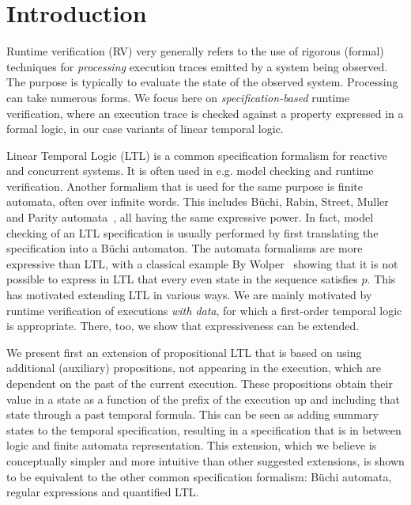 \section{Introduction}

Runtime verification (RV)  \cite{bartocci18,havelund-rv-data-2018} very generally refers to the use of rigorous (formal) 
techniques for {\em processing} execution traces emitted by a system being observed. The purpose is typically
to evaluate the state of the observed system. Processing can take numerous
forms. We focus here on {\em specification-based} runtime verification, where an execution trace is checked against a property expressed in a formal logic, in our case variants of linear temporal logic.

Linear Temporal Logic (LTL) is a common specification formalism for reactive and concurrent systems. It is often used in e.g. model checking and runtime verification. Another formalism that is used for the same purpose is finite automata, often over infinite words. This includes B\"{u}chi, Rabin, Street, Muller and Parity automata~\cite{Thomas}, all having the same expressive power. In fact, model checking of an LTL specification
is usually performed by first translating the specification into a B\"{u}chi automaton. The automata formalisms are more expressive than LTL, with a classical example By Wolper~\cite{Wolper} showing that
it is not possible to express in LTL that every even state in
the sequence satisfies $p$. This has motivated extending LTL
in various ways.
We are mainly motivated by runtime verification of executions {\em with data}, for which a first-order temporal logic is
appropriate. There, too, we show that expressiveness can be extended.

We present first an extension of  propositional LTL that is based on using additional (auxiliary) propositions, not appearing in the execution, which are dependent on the past 
of the current execution. These propositions obtain their value in a state as a function of the prefix of the execution up and including that state through a past temporal formula. This can be seen as adding
summary states to the temporal specification, resulting in a specification that is in between logic and finite automata representation. This extension, which we believe is conceptually simpler
and more intuitive than other suggested extensions, is shown to be
equivalent to the other common specification formalism:
B\"{u}chi automata, regular expressions and quantified LTL.

